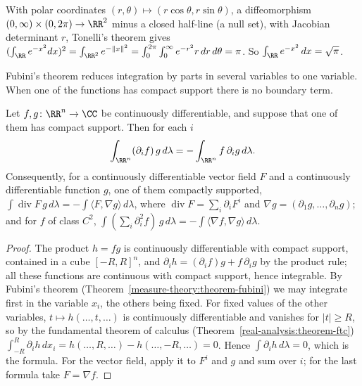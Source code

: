 \begin{example}\label{measure-theory:example-gaussian}
With polar coordinates $(r, \theta) \mapsto (r\cos\theta, r\sin\theta)$, a diffeomorphism $(0, \infty) \times (0, 2\pi) \to \RR^2$ minus a closed half-line (a null set), with Jacobian determinant $r$,
Tonelli's theorem gives $(\int_\RR e^{-x^2}dx)^2 = \int_{\RR^2}e^{-\|x\|^2} = \int_0^{2\pi}\int_0^\infty e^{-r^2}r\,dr\,d\theta = \pi$. So $\int_\RR e^{-x^2}\,dx = \sqrt{\pi}$.
\end{example}

Fubini's theorem reduces integration by parts in several variables to one variable. When one of the functions has compact support there is no boundary term.

\begin{proposition}\label{measure-theory:proposition-integration-by-parts}
Let $f, g \colon \RR^n \to \CC$ be continuously differentiable, and suppose that one of them has compact support. Then for each $i$
\[
\int_{\RR^n}(\partial_if)\,g\,d\lambda = -\int_{\RR^n}f\,\partial_ig\,d\lambda .
\]
Consequently, for a continuously differentiable vector field $F$ and a continuously differentiable function $g$, one of them compactly supported,
$\int\operatorname{div}F\,g\,d\lambda = -\int\langle F, \nabla g\rangle\,d\lambda$, where $\operatorname{div}F = \sum_i\partial_iF^i$ and $\nabla g = (\partial_1g, \ldots, \partial_ng)$; and for $f$ of class $C^2$,
$\int(\sum_i\partial_i^2f)\,g\,d\lambda = -\int\langle\nabla f, \nabla g\rangle\,d\lambda$.
\end{proposition}

\begin{proof}
The product $h = fg$ is continuously differentiable with compact support, contained in a cube $[-R, R]^n$, and $\partial_ih = (\partial_if)g + f\,\partial_ig$ by the product rule; all these functions are
continuous with compact support, hence integrable. By Fubini's theorem (Theorem~\ref{measure-theory:theorem-fubini}) we may integrate first in the variable $x_i$, the others being fixed. For fixed
values of the other variables, $t \mapsto h(\ldots, t, \ldots)$ is continuously differentiable and vanishes for $|t| \geq R$, so by the fundamental theorem of calculus
(Theorem~\ref{real-analysis:theorem-ftc}) $\int_{-R}^R\partial_ih\,dx_i = h(\ldots, R, \ldots) - h(\ldots, -R, \ldots) = 0$. Hence $\int\partial_ih\,d\lambda = 0$, which is the formula. For the vector field,
apply it to $F^i$ and $g$ and sum over $i$; for the last formula take $F = \nabla f$.
\end{proof}

